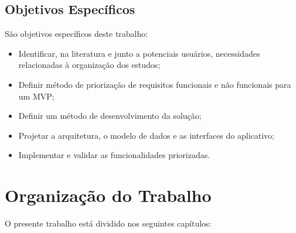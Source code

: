 \subsection{Objetivos Específicos}

São objetivos específicos deste trabalho:

\begin{itemize}

\item Identificar, na literatura e junto a potenciais usuários, necessidades relacionadas à organização dos estudos;

\item Definir método de priorização de requisitos funcionais e não funcionais para um MVP;

\item Definir um método de desenvolvimento da solução;

\item Projetar a arquitetura, o modelo de dados e as interfaces do aplicativo;

\item Implementar e validar as funcionalidades priorizadas.

\end{itemize}

\section{Organização do Trabalho}

O presente trabalho está dividido nos seguintes capítulos:


